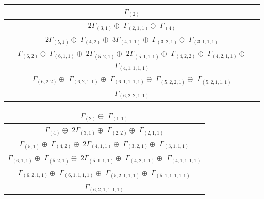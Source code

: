 \documentclass[main.tex]{subfiles}
\begin{document}
\bigskip
\begin{minipage}{1\textwidth}
\centering
\begin{tabular}{c}
$\Gamma_{(
2
)}$
\\ \hline
$ 2 \Gamma_{(
3 , 
1
)} \oplus$
$\Gamma_{(
2 , 
1 , 
1
)} \oplus$
$\Gamma_{(
4
)}$
\\ \hline
$ 2 \Gamma_{(
5 , 
1
)} \oplus$
$\Gamma_{(
4 , 
2
)} \oplus$
$ 3 \Gamma_{(
4 , 
1 , 
1
)} \oplus$
$\Gamma_{(
3 , 
2 , 
1
)} \oplus$
$\Gamma_{(
3 , 
1 , 
1 , 
1
)}$
\\ \hline
$\Gamma_{(
6 , 
2
)} \oplus$
$\Gamma_{(
6 , 
1 , 
1
)} \oplus$
$ 2 \Gamma_{(
5 , 
2 , 
1
)} \oplus$
$ 2 \Gamma_{(
5 , 
1 , 
1 , 
1
)} \oplus$
$\Gamma_{(
4 , 
2 , 
2
)} \oplus$
$\Gamma_{(
4 , 
2 , 
1 , 
1
)} \oplus$
$\Gamma_{(
4 , 
1 , 
1 , 
1 , 
1
)}$
\\ \hline
$\Gamma_{(
6 , 
2 , 
2
)} \oplus$
$\Gamma_{(
6 , 
2 , 
1 , 
1
)} \oplus$
$\Gamma_{(
6 , 
1 , 
1 , 
1 , 
1
)} \oplus$
$\Gamma_{(
5 , 
2 , 
2 , 
1
)} \oplus$
$\Gamma_{(
5 , 
2 , 
1 , 
1 , 
1
)}$
\\ \hline
$\Gamma_{(
6 , 
2 , 
2 , 
1 , 
1
)}$
\\
\end{tabular}\end{minipage}
\bigskip
\begin{minipage}{.5\textwidth}
\centering
\begin{tabular}{c}
$\Gamma_{(
2
)} \oplus$
$\Gamma_{(
1 , 
1
)}$
\\ \hline
$\Gamma_{(
4
)} \oplus$
$ 2 \Gamma_{(
3 , 
1
)} \oplus$
$\Gamma_{(
2 , 
2
)} \oplus$
$\Gamma_{(
2 , 
1 , 
1
)}$
\\ \hline
$\Gamma_{(
5 , 
1
)} \oplus$
$\Gamma_{(
4 , 
2
)} \oplus$
$ 2 \Gamma_{(
4 , 
1 , 
1
)} \oplus$
$\Gamma_{(
3 , 
2 , 
1
)} \oplus$
$\Gamma_{(
3 , 
1 , 
1 , 
1
)}$
\\ \hline
$\Gamma_{(
6 , 
1 , 
1
)} \oplus$
$\Gamma_{(
5 , 
2 , 
1
)} \oplus$
$ 2 \Gamma_{(
5 , 
1 , 
1 , 
1
)} \oplus$
$\Gamma_{(
4 , 
2 , 
1 , 
1
)} \oplus$
$\Gamma_{(
4 , 
1 , 
1 , 
1 , 
1
)}$
\\ \hline
$\Gamma_{(
6 , 
2 , 
1 , 
1
)} \oplus$
$\Gamma_{(
6 , 
1 , 
1 , 
1 , 
1
)} \oplus$
$\Gamma_{(
5 , 
2 , 
1 , 
1 , 
1
)} \oplus$
$\Gamma_{(
5 , 
1 , 
1 , 
1 , 
1 , 
1
)}$
\\ \hline
$\Gamma_{(
6 , 
2 , 
1 , 
1 , 
1 , 
1
)}$
\\
\end{tabular}\end{minipage}
\end{document}

